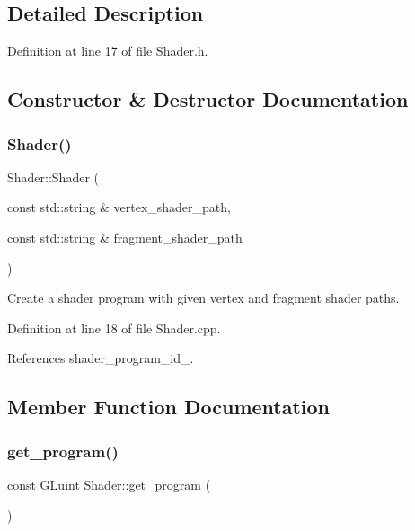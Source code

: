 \subsection{Detailed Description}


Definition at line 17 of file Shader.\+h.



\subsection{Constructor \& Destructor Documentation}
\mbox{\label{classShader_a9f793135f05ad21d6e4e4671de688d7b}} 
\subsubsection{\texorpdfstring{Shader()}{Shader()}}
{\footnotesize\ttfamily Shader\+::\+Shader (\begin{DoxyParamCaption}\item[{const std\+::string \&}]{vertex\+\_\+shader\+\_\+path,  }\item[{const std\+::string \&}]{fragment\+\_\+shader\+\_\+path }\end{DoxyParamCaption})}



Create a shader program with given vertex and fragment shader paths. 



Definition at line 18 of file Shader.\+cpp.



References shader\+\_\+program\+\_\+id\+\_\+.



\subsection{Member Function Documentation}
\mbox{\label{classShader_a3d9c30f7fb8c679a7389c31e51fac596}} 
\subsubsection{\texorpdfstring{get\+\_\+program()}{get\_program()}}
{\footnotesize\ttfamily const G\+Luint Shader\+::get\+\_\+program (\begin{DoxyParamCaption}{ }\end{DoxyParamCaption})\hspace{0.3cm}{\ttfamily [inline]}}



